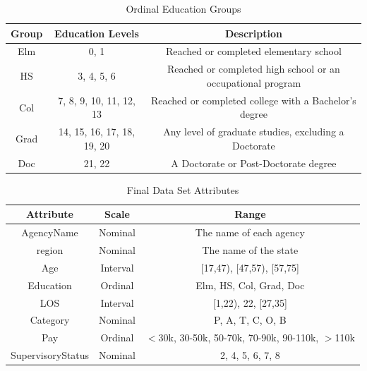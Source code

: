 \documentclass{article}
\begin{document}
    \begin{center}
        \begin{table}
            \centering
            \begin{tabular}{ |c|c|c| }
                \hline
                Group & Education Levels & Description \\
                \hline
                Elm & 0, 1 & Reached or completed elementary school \\
                HS & 3, 4, 5, 6 & Reached or completed high school or an occupational program \\
                Col & 7, 8, 9, 10, 11, 12, 13 & Reached or completed college with a Bachelor's degree \\
                Grad & 14, 15, 16, 17, 18, 19, 20 & Any level of graduate studies, excluding a Doctorate \\
                Doc & 21, 22 & A Doctorate or Post-Doctorate degree \\
                \hline
            \end{tabular}
            \caption{Ordinal Education Groups}
            \label{tab:2}
        \end{table}
    \end{center}

    \begin{center}
        \begin{table}
            \centering
            \begin{tabular}{ |c|c|c| }
                \hline
                Attribute & Scale & Range \\
                \hline
                AgencyName & Nominal & The name of each agency \\
                region & Nominal & The name of the state \\
                Age & Interval & [17,47), [47,57), [57,75] \\
                Education & Ordinal & Elm, HS, Col, Grad, Doc \\
                LOS & Interval & [1,22), 22, [27,35] \\
                Category & Nominal & P, A, T, C, O, B \\
                Pay & Ordinal & $<$30k, 30-50k, 50-70k, 70-90k, 90-110k, $>$110k \\
                SupervisoryStatus & Nominal & 2, 4, 5, 6, 7, 8 \\
                \hline
            \end{tabular}
            \caption{Final Data Set Attributes}
            \label{tab:3}
        \end{table}
    \end{center}
\end{document}
